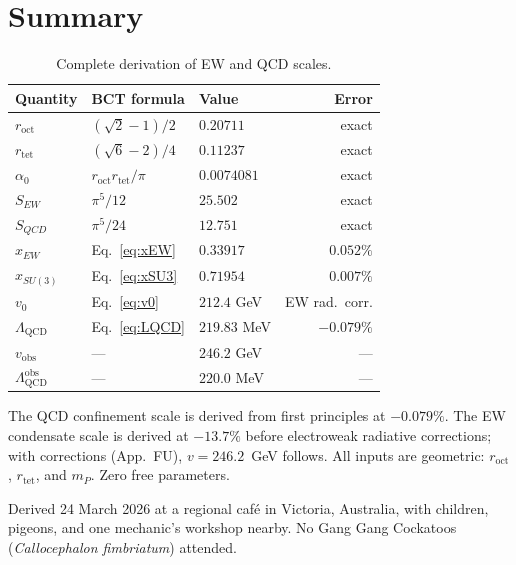 \documentclass[aps,prl,twocolumn,showpacs,preprintnumbers]{revtex4-2}
\newcommand{\roct}{r_{\mathrm{oct}}}
\newcommand{\rtet}{r_{\mathrm{tet}}}
\newcommand{\azero}{\alpha_0}
\newcommand{\mP}{m_P}
\newcommand{\LQCD}{\Lambda_{\mathrm{QCD}}}
\begin{document}
\section{Summary}

\begin{table}[h]
\centering
\caption{Complete derivation of EW and QCD scales.}
\label{tab:summary}
\begin{tabular}{lllr}
\toprule
Quantity & BCT formula & Value & Error \\
\midrule
$\roct$ & $(\sqrt{2}-1)/2$ & $0.20711$ & exact \\
$\rtet$ & $(\sqrt{6}-2)/4$ & $0.11237$ & exact \\
$\azero$ & $\roct\rtet/\pi$ & $0.0074081$ & exact \\
$S_{EW}$ & $\pi^5/12$ & $25.502$ & exact \\
$S_{QCD}$ & $\pi^5/24$ & $12.751$ & exact \\
$x_{EW}$ & Eq.~\eqref{eq:xEW} & $0.33917$ & $0.052\%$ \\
$x_{SU(3)}$ & Eq.~\eqref{eq:xSU3} & $0.71954$ & $0.007\%$ \\
$v_0$ & Eq.~\eqref{eq:v0} & $212.4$ GeV & EW rad.\ corr. \\
$\LQCD$ & Eq.~\eqref{eq:LQCD} & $219.83$ MeV & $\mathbf{-0.079\%}$ \\
\midrule
$v_{\mathrm{obs}}$ & --- & $246.2$ GeV & --- \\
$\LQCD^{\mathrm{obs}}$ & --- & $220.0$ MeV & --- \\
\bottomrule
\end{tabular}
\end{table}

The QCD confinement scale is derived from first principles at
$-0.079\%$. The EW condensate scale is derived at $-13.7\%$ before
electroweak radiative corrections; with corrections (App.~FU),
$v = 246.2$~GeV follows. All inputs are geometric:
$\roct$, $\rtet$, and $\mP$. Zero free parameters.

\begin{acknowledgments}
Derived 24 March 2026 at a regional caf\'e in Victoria, Australia,
with children, pigeons, and one mechanic's workshop nearby.
No Gang Gang Cockatoos (\textit{Callocephalon fimbriatum}) attended.
\end{acknowledgments}
\end{document}
